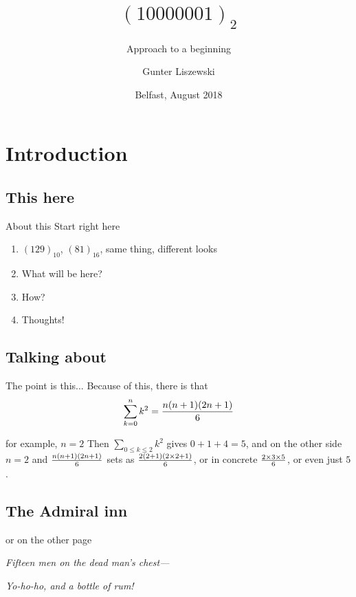 \documentclass[pdf]{beamer}
\title{$(10000001)_2$}
\subtitle{Approach to a beginning}
\author[Gunter Liszewski\\ \copyright 2018]{Gunter Liszewski}
\date{Belfast, August 2018}
\begin{document}
\begin{frame}
  \titlepage
\end{frame}


\section{Introduction}
\subsection{This here}

\begin{frame}{About this}
  Start right here
  \begin{enumerate}[A]
    \pause
    \item{} $(129)_{10}$, $(81)_{16}$, same thing, different looks
    \pause
    \item{} What will be here?
    \pause
    \item{} How?
    \pause
    \item{} Thoughts!
  \end{enumerate}
\end{frame}
\subsection{Talking about}

\begin{frame}{The point is this...}
  Because of this, there is that
$$\sum_{k=0}^{n}{k^2}={n(n+1)(2n+1)\over 6}$$
\end{frame}


\begin{frame}{for example, $n=2$}
  Then $\sum_{0\le k\le2}k^2$ gives $0+1+4=5$, and on the other side $n=2$ and ${n(n+1)(2n+1)\over 6}$
sets as ${2(2+1)(2\times2+1)\over 6}$, or in concrete $2\times3\times5\over6$, or even just $5$.
\end{frame}

\subsection{The Admiral inn}

\begin{frame}{or on the other page}

  {\hfil\sl{}Fifteen men on the dead man's chest---}

             {\hfil\sl{}Yo-ho-ho, and a bottle of rum!}
\end{frame}
\end{document}
